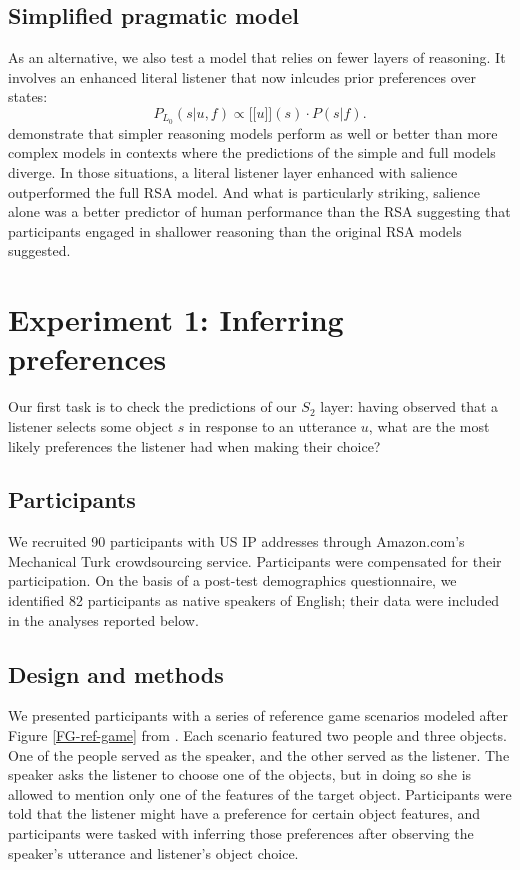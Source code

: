 \documentclass[10pt,a4paper]{article}
\newcommand{\sem}[1]{\mbox{$[\![$#1$]\!]$}}
\begin{document}
\subsection{Simplified pragmatic model}

As an alternative, we also test a model that relies on fewer layers of reasoning. It involves an enhanced literal listener that now inlcudes prior preferences over states:
$$P_{L_{0}}(s|u,f) \propto \sem{$u$}(s) \cdot P(s|f).$$
 demonstrate that simpler reasoning models perform as well or better than more complex models in contexts where the predictions of the simple and full models diverge. In those situations, a literal listener layer enhanced with salience outperformed the full RSA model. And what is particularly striking, salience alone was a better predictor of human performance than the RSA suggesting that participants engaged in shallower reasoning than the original RSA models suggested.  

\section{Experiment 1: Inferring preferences}

Our first task is to check the predictions of our $S_2$ layer: having observed that a listener selects some object $s$ in response to an utterance $u$, what are the most likely preferences the listener had when making their choice? 

\subsection{Participants}

We recruited 90 participants with US IP addresses through Amazon.com's Mechanical Turk crowdsourcing service. Participants were compensated for their participation. On the basis of a post-test demographics questionnaire, we identified 82 participants as native speakers of English; their data were included in the analyses reported below.

\subsection{Design and methods}

We presented participants with a series of reference game scenarios modeled after Figure \ref{FG-ref-game} from . Each scenario featured two people and three objects. One of the people served as the speaker, and the other served as the listener. The speaker asks the listener to choose one of the objects, but in doing so she is allowed to mention only one of the features of the target object. Participants were told that the listener might have a preference for certain object features, and participants were tasked with inferring those preferences after observing the speaker's utterance and listener's object choice.
\end{document}

